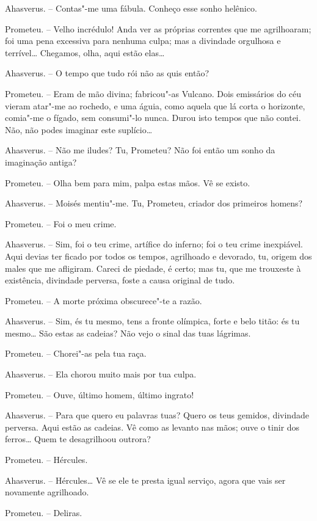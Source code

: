 Ahasverus. -- Contas"-me uma fábula. Conheço esse sonho helênico.

Prometeu. -- Velho incrédulo! Anda ver as próprias correntes que me
agrilhoaram; foi uma pena excessiva para nenhuma culpa; mas a divindade
orgulhosa e terrível\ldots{} Chegamos, olha, aqui estão elas\ldots{}

Ahasverus. -- O tempo que tudo rói não as quis então?

Prometeu. -- Eram de mão divina; fabricou"-as Vulcano. Dois emissários do
céu vieram atar"-me ao rochedo, e uma águia, como aquela que lá corta o
horizonte, comia"-me o fígado, sem consumi"-lo nunca. Durou isto tempos
que não contei. Não, não podes imaginar este suplício\ldots{}

Ahasverus. -- Não me iludes? Tu, Prometeu? Não foi então um sonho da
imaginação antiga?

Prometeu. -- Olha bem para mim, palpa estas mãos. Vê se existo.

Ahasverus. -- Moisés mentiu"-me. Tu, Prometeu, criador dos primeiros
homens?

Prometeu. -- Foi o meu crime.

Ahasverus. -- Sim, foi o teu crime, artífice do inferno; foi o teu crime
inexpiável. Aqui devias ter ficado por todos os tempos, agrilhoado e
devorado, tu, origem dos males que me afligiram. Careci de piedade, é
certo; mas tu, que me trouxeste à existência, divindade perversa, foste
a causa original de tudo.

Prometeu. -- A morte próxima obscurece"-te a razão.

Ahasverus. -- Sim, és tu mesmo, tens a fronte olímpica, forte e belo
titão: és tu mesmo\ldots{} São estas as cadeias? Não vejo o sinal das tuas
lágrimas.

Prometeu. -- Chorei"-as pela tua raça.

Ahasverus. -- Ela chorou muito mais por tua culpa.

Prometeu. -- Ouve, último homem, último ingrato!

Ahasverus. -- Para que quero eu palavras tuas? Quero os teus gemidos,
divindade perversa. Aqui estão as cadeias. Vê como as levanto nas mãos;
ouve o tinir dos ferros\ldots{} Quem te desagrilhoou outrora?

Prometeu. -- Hércules.

Ahasverus. -- Hércules\ldots{} Vê se ele te presta igual serviço, agora que
vais ser novamente agrilhoado.

Prometeu. -- Deliras.

